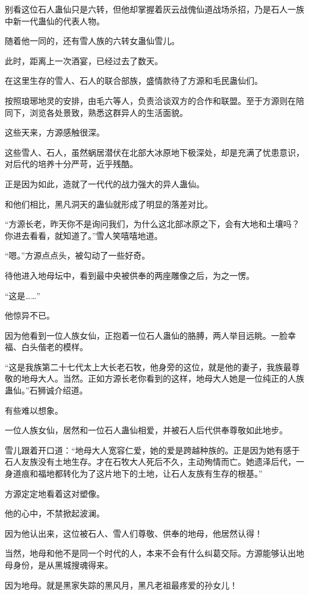 \begin{this_body}
别看这位石人蛊仙只是六转，但他却掌握着灰云战傀仙道战场杀招，乃是石人一族中新一代蛊仙的代表人物。

随着他一同的，还有雪人族的六转女蛊仙雪儿。

此时，距离上一次酒宴，已经过去了数天。

在这里生存的雪人、石人的联合部族，盛情款待了方源和毛民蛊仙们。

按照琅琊地灵的安排，由毛六等人，负责洽谈双方的合作和联盟。至于方源则在陪同下，浏览各处景致，熟悉这群异人的生活面貌。

这些天来，方源感触很深。

这些雪人、石人，虽然蜗居潜伏在北部大冰原地下极深处，却是充满了忧患意识，对后代的培养十分严苛，近乎残酷。

正是因为如此，造就了一代代的战力强大的异人蛊仙。

和他们相比，黑凡洞天的蛊仙就形成了明显的落差对比。

“方源长老，昨天你不是询问我们，为什么这北部冰原之下，会有大地和土壤吗？你进去看看，就知道了。”雪人笑嘻嘻地道。

“嗯。”方源点点头，被勾动了一些好奇。

待他进入地母坛中，看到最中央被供奉的两座雕像之后，为之一愣。

“这是……”

他惊异不已。

因为他看到一位人族女仙，正抱着一位石人蛊仙的胳膊，两人举目远眺。一脸幸福、白头偕老的模样。

“这是我族第二十七代太上大长老石牧，他身旁的这位，就是他的妻子，我族最尊敬的地母大人。当然。正如方源长老你看到的这样，地母大人她是一位纯正的人族蛊仙。”石狮诚介绍道。

有些难以想象。

一位人族女仙，居然和一位石人蛊仙相爱，并被石人后代供奉尊敬如此地步。

雪儿跟着开口道：“地母大人宽容仁爱，她的爱是跨越种族的。正是因为她有感于石人友族没有土地生存。才在石牧大人死后不久，主动殉情而亡。她遗泽后代，一身道痕和福地都转化为了这片地下的土地，让石人友族有生存的根基。”

方源定定地看着这对塑像。

他的心中，不禁掀起波澜。

因为他认出来，这位被石人、雪人们尊敬、供奉的地母，他居然认得！

当然，地母和他不是同一个时代的人，本来不会有什么纠葛交际。方源能够认出地母身份，是从黑城搜魂得来。

因为地母。就是黑家失踪的黑风月，黑凡老祖最疼爱的孙女儿！


\end{this_body}

